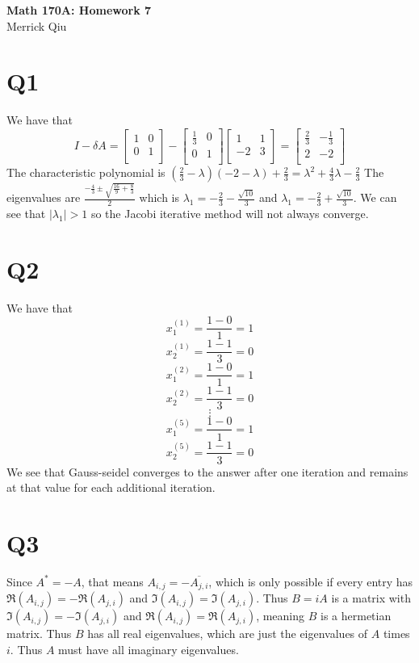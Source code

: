 \documentclass{article}
\begin{document}
\begin{center}
	\huge{\bf Math 170A: Homework 7} \\
	Merrick Qiu
\end{center}

\section*{Q1}
We have that 
\[
    I - \delta A = 
    \begin{bmatrix}
        1 & 0 \\
        0 & 1 \\
    \end{bmatrix} -
    \begin{bmatrix}
        \frac{1}{3} & 0 \\
        0 & 1 \\
    \end{bmatrix}
    \begin{bmatrix}
        1 & 1 \\
        -2 & 3 \\
    \end{bmatrix} = 
    \begin{bmatrix}
        \frac{2}{3} & -\frac{1}{3} \\
        2 & -2 \\ 
    \end{bmatrix}
\]
The characteristic polynomial is 
$(\frac{2}{3} - \lambda)(-2-\lambda) + \frac{2}{3} = \lambda^2 + \frac{4}{3}\lambda - \frac{2}{3}$
The eigenvalues are $\frac{-\frac{4}{3}\pm \sqrt{\frac{16}{9}+ \frac{8}{3}}}{2}$
which is $\lambda_1 = -\frac{2}{3} - \frac{\sqrt{10}}{3}$ and 
$\lambda_1 = -\frac{2}{3} + \frac{\sqrt{10}}{3}$.
We can see that $|\lambda_1| > 1$ so the Jacobi iterative method 
will not always converge.
\newpage

\section*{Q2}
We have that 
\[
    x_1^{(1)} = \frac{1 - 0}{1} = 1 
\]
\[
    x_2^{(1)} = \frac{1 - 1}{3} = 0 
\]
\[
    x_1^{(2)} = \frac{1 - 0}{1} = 1 
\]
\[
    x_2^{(2)} = \frac{1 - 1}{3} = 0 
\]
\[
    \vdots
\]
\[
    x_1^{(5)} = \frac{1 - 0}{1} = 1 
\]
\[
    x_2^{(5)} = \frac{1 - 1}{3} = 0 
\]
We see that Gauss-seidel converges to the answer after one iteration
and remains at that value for each additional iteration.
\newpage

\section*{Q3}
Since $A^* = -A$, that means $A_{i,j} = -\overline{A_{j,i}}$,
which is only possible if every entry has 
$\Re(A_{i,j}) = -\Re(A_{j,i})$ and $\Im(A_{i,j}) = \Im(A_{j,i})$.
Thus $B=iA$ is a matrix with 
$\Im(A_{i,j}) = -\Im(A_{j,i})$ and $\Re(A_{i,j}) = \Re(A_{j,i})$,
meaning $B$ is a hermetian matrix.
Thus $B$ has all real eigenvalues, which are just the eigenvalues of $A$
times $i$. Thus $A$ must have all imaginary eigenvalues.
\newpage 
\end{document}
